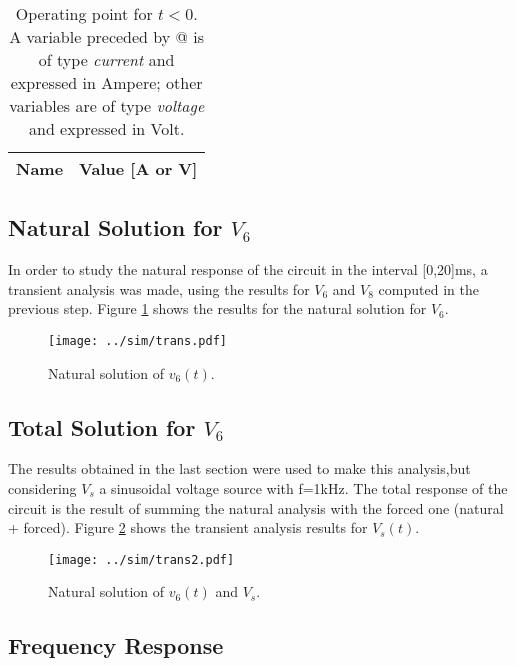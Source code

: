 \begin{table}[h]
  \centering
  \begin{tabular}{|l|r|}
    \hline    
    {\bf Name} & {\bf Value [A or V]} \\ \hline
    
  \end{tabular}
  \caption{Operating point for $t<0$. A variable preceded by @ is of type {\em current}
    and expressed in Ampere; other variables are of type {\it voltage} and expressed in
    Volt.}
  \label{tab:SIM_PASSO2}
\end{table}

\subsection{Natural Solution for $V_6$}

In order to study the natural response of the circuit in the interval [0,20]ms, a transient analysis was made, using the results for $V_6$ and $V_8$ computed in the previous step. Figure \ref{fig:SIM_NAT_SOL} shows the results for the natural solution for $V_6$.

\begin{figure}[h] \centering
\vspace{-3cm}
\texttt{[image: ../sim/trans.pdf]}
\caption{Natural solution of $v_6(t)$.}
\label{fig:SIM_NAT_SOL}
\end{figure}

\newpage
\subsection{Total Solution for $V_6$}

The results obtained in the last section were used to make this analysis,but considering $V_s$ a sinusoidal voltage source with f=1kHz. The total response of the circuit is the result of summing the natural analysis with the forced one (natural + forced). 
Figure \ref{fig:SIM_TOT_SOL} shows the transient analysis results for $V_s(t)$.

\begin{figure}[h] \centering
\texttt{[image: ../sim/trans2.pdf]}
\caption{Natural solution of $v_6(t)$ and $V_s$.}
\label{fig:SIM_TOT_SOL}
\end{figure}

\newpage
\subsection{Frequency Response}


